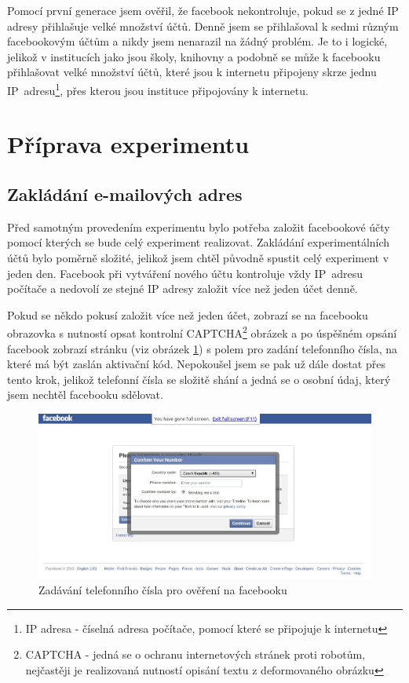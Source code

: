 \documentclass[thesis=M,czech]{FITthesis}[2013/05/10]
\begin{document}
Pomocí první generace jsem ověřil, že facebook nekontroluje, pokud se z jedné IP adresy přihlašuje velké množství účtů. Denně jsem se přihlašoval k sedmi různým facebookovým účtům a nikdy jsem nenarazil na žádný problém. Je to i logické, jelikož v institucích jako jsou školy, knihovny a podobně se může k facebooku přihlašovat velké množství účtů, které jsou k internetu připojeny skrze jednu IP~adresu\footnote{IP adresa - číselná adresa počítače, pomocí které se připojuje k internetu}, přes kterou jsou instituce připojovány k internetu.

\section{Příprava experimentu}

\subsection{Zakládání e-mailových adres}

Před samotným provedením experimentu bylo potřeba založit facebookové účty pomocí kterých se bude celý experiment realizovat. Zakládání experimentálních účtů bylo poměrně složité, jelikož jsem chtěl původně spustit celý experiment v jeden den. Facebook při vytváření nového účtu kontroluje vždy IP~adresu počítače a nedovolí ze stejné IP adresy založit více než jeden účet denně. 

Pokud se někdo pokusí založit více než jeden účet, zobrazí se na facebooku obrazovka s nutností opsat kontrolní CAPTCHA\footnote{CAPTCHA - jedná se o ochranu internetových stránek proti robotům, nejčastěji je realizovaná nutností opisání textu z deformovaného obrázku} obrázek a po úspěšném opsání facebook zobrazí stránku (viz obrázek \ref{fig:fbTelephoneNubmer}) s polem pro zadání telefonního čísla, na které má být zaslán aktivační kód. Nepokoušel jsem se pak už dále dostat přes tento krok, jelikož telefonní čísla se složitě shání a jedná se o osobní údaj, který jsem nechtěl facebooku sdělovat.

\begin{figure}[h]
\begin{center}
\includegraphics[width=5in]{figures/fb-telephone-number2.jpg}
\caption{Zadávání telefonního čísla pro ověření na facebooku}
\label{fig:fbTelephoneNubmer}
\end{center}
\end{figure}
\end{document}
